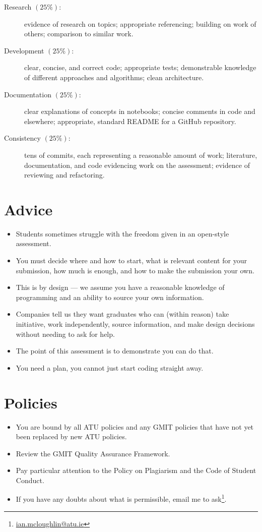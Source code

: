 \documentclass[a4paper]{tufte-handout}
\begin{document}
\begin{description}
  \item[Research $(25\%)$:] evidence of research on topics; appropriate referencing; building on work of others; comparison to similar work.
  \item[Development $(25\%)$:] clear, concise, and correct code; appropriate tests; demonstrable knowledge of different approaches and algorithms; clean architecture.
  \item[Documentation $(25\%)$:] clear explanations of concepts in notebooks; concise comments in code and elsewhere; appropriate, standard README for a GitHub repository.
  \item[Consistency $(25\%)$:] tens of commits, each representing a reasonable amount of work; literature, documentation, and code evidencing work on the assessment; evidence of reviewing and refactoring.
\end{description}


\section{Advice}

\begin{itemize}
  \item Students sometimes struggle with the freedom given in an open-style assessment.
  \item You must decide where and how to start, what is relevant content for your submission, how much is enough, and how to make the submission your own.
  \item This is by design --- we assume you have a reasonable knowledge of programming and an ability to source your own information.
  \item Companies tell us they want graduates who can (within reason) take initiative, work independently, source information, and make design decisions without needing to ask for help.
  \item The point of this assessment is to demonstrate you can do that.
  \item You need a plan, you cannot just start coding straight away.
\end{itemize}


\section{Policies}

\begin{itemize}
  \item You are bound by all ATU policies and any GMIT policies that have not yet been replaced by new ATU policies.
  \item Review the GMIT Quality Assurance Framework\cite{gmitqaf}.
  \item Pay particular attention to the Policy on Plagiarism and the Code of Student Conduct.
  \item If you have any doubts about what is permissible, email me to ask\footnote{\url{ian.mcloughlin@atu.ie}}.
\end{itemize}



\end{document}
